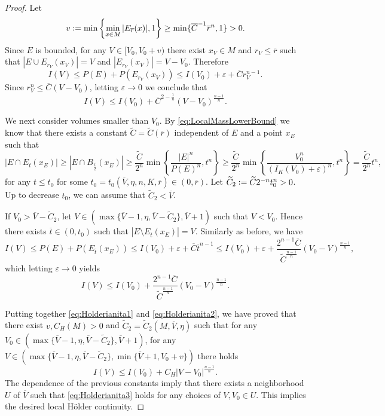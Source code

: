 \documentclass[a4paper,12pt,reqno]{amsart}
\numberwithin{equation}{section}
\theoremstyle{plain}
\theoremstyle{definition}
\theoremstyle{remark}
\newcommand{\eps}{\varepsilon}
\newcommand{\eqdef}{\ensuremath{\vcentcolon=}}
\begin{document}
{\begin{proof}
Let
\[
v\eqdef \min\left\{\min_{x\in M} | E_{\overline{r}}(x)| , 1\right\} \ge \min\{ \overline{C}^{-1}\overline{r}^n, 1\}>0.
\]
Since $E$ is bounded, for any $V \in [V_0,V_0+v)$ there exist $x_V \in M$ and $r_V \le \overline{r}$ such that $|E \cup E_{r_V}(x_V)|=V$ and $|E_{r_V}(x_V)| = V-V_0$. Therefore
\begin{equation*}
	I(V) \le P(E) + P(E_{r_V}(x_V)) \le I(V_0) + \eps + \overline{C} r_V^{n-1}.
\end{equation*}
Since $r_V^n \le \overline{C}(V-V_0)$, letting $\eps\to0$ we conclude that
\begin{equation}\label{eq:Holderianita1}
	I(V) \le  I(V_0) + \overline{C}^{2-\frac1n} (V-V_0)^{\frac{n-1}{n}}.
\end{equation}

We next consider volumes smaller than $V_0$. By \eqref{eq:LocalMassLowerBound} we know that there exists a constant $\widetilde{C}=\widetilde{C}(\overline{r})$ independent of $E$ and a point $x_E$ such that
\[
|E \cap E_t(x_E)| \ge |E \cap B_{\frac{t}{2}}(x_E)| \ge \frac{\widetilde{C}}{2^n} \min\left\{ \frac{|E|^n}{P(E)^n} , t^n \right\} \ge \frac{\widetilde{C}}{2^n} \min\left\{ \frac{V_0^n}{(I_K(V_0)+\eps)^n} , t^n \right\} =  \frac{\widetilde{C}}{2^n} t^n,
\]
for any $t\le t_0$ for some $t_0=t_0(\overline{V}, \eta, n, K, \overline{r}) \in(0, \overline{r})$. Let $\widetilde{C}_2 \eqdef \widetilde{C} 2^{-n} t_0^n>0$. Up to decrease $t_0$, we can assume that $\widetilde{C}_2< \overline{V}$.

If $V_0>\overline{V}-\widetilde{C}_2$, let $V \in ( \max\{\overline{V}-1, \eta, \overline{V}-\widetilde{C}_2\}, \overline{V}+1)$ such that $V < V_0$. Hence there exists $\overline{t} \in (0,t_0)$ such that $|E\setminus E_{\overline{t}}(x_E)| =V$. Similarly as before, we have
\begin{equation*}
	I(V) \le P(E) + P(E_{\overline{t}}(x_E)) \le I(V_0) + \eps +\overline{C} \overline{t}^{n-1}
	\le I(V_0) + \eps + \frac{2^{n-1}\overline{C}}{\widetilde{C}^{\frac{n-1}{n}}}(V_0-V)^{\frac{n-1}{n}},
\end{equation*}
which letting $\eps\to0$ yields
\begin{equation}\label{eq:Holderianita2}
	I(V) \le I(V_0)  + \frac{2^{n-1}\overline{C}}{\widetilde{C}^{\frac{n-1}{n}}}(V_0-V)^{\frac{n-1}{n}}.
\end{equation}

Putting together \eqref{eq:Holderianita1} and \eqref{eq:Holderianita2}, we have proved that there exist $v, C_H(M)>0$ and $\widetilde{C}_2=\widetilde{C}_2(M,\overline{V},\eta)$ such that for any $V_0 \in  ( \max\{\overline{V}-1, \eta, \overline{V}-\widetilde{C}_2\}, \overline{V}+1)$, for any $V \in  ( \max\{\overline{V}-1, \eta, \overline{V}-\widetilde{C}_2\}, \min\{\overline{V}+1, V_0+v\})$ there holds
\begin{equation}\label{eq:Holderianita3}
I(V) \le I(V_0) + C_H|V-V_0|^{\frac{n-1}{n}}.	
\end{equation}
The dependence of the previous constants imply that there exists a neighborhood $U$ of $\overline{V}$ such that \eqref{eq:Holderianita3} holds for any choices of $V,V_0 \in U$. This implies the desired local H\"{o}lder continuity.
\end{proof}


}
\end{document}
